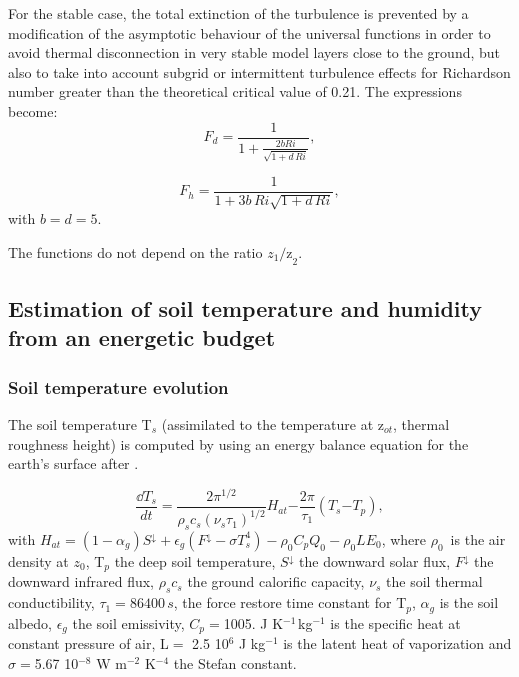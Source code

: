 For the stable case, the total extinction of the turbulence is prevented by
a modification of the asymptotic behaviour of the universal functions in
order to avoid thermal disconnection in very stable model layers close to
the ground, but also to take into account subgrid or intermittent turbulence
effects for Richardson number greater than the theoretical critical value of
0.21. The expressions become:
\begin{equation}
\label{eq20}
F_{d} =\frac{1}{1+\frac{2bRi}{\sqrt
{1+d\, Ri} }},
\end{equation}

\begin{equation}
\label{eq21}
F_{h} =\frac{1}{1+ 3 b \, Ri\sqrt
{1+ d \, Ri} },
\end{equation}
with $b = d = 5$.

The functions do not depend on the ratio $z_{1}
\mbox{/z}_{2} $.

\subsection{Estimation of soil temperature and humidity from an energetic budget}

\subsubsection{Soil temperature evolution}
The soil temperature T$_{s}$ (assimilated to the temperature at z$_{ot}$,
thermal roughness height) is computed by using an energy balance equation
for the earth's surface after \cite{Deardorff:1978}.

\begin{equation}
\label{eq22}
\frac{\dd T_{s}}{dt}\mathrm{=}\frac{\mathrm{2}\pi^{\mathrm{1/2}}}{\rho
_{s}c_{s}\left( \nu_{s}\tau_{\mathrm{1}}
\right)^{\mathrm{1/2}}}H_{at}\mathrm{-}\frac{\mathrm{2}\pi }{\tau
_{\mathrm{1}}}\left( T_{s}\mathrm{-}T_{p} \right),
\end{equation}
\newline
with $H_{at}=\left( 1-\alpha_{g} \right)S^\downarrow +\epsilon
_{g}(F^\downarrow -\sigma T_{s}^{4})-\rho_{0}C_{p}Q_{0}-\rho_{0}LE_{0}$,
\newline
where $\rho_{0}\, $ is the air density at $z_{0}$, T$_{p}$ the deep soil temperature,
\newline
$S^\downarrow $ the downward solar flux, $F^\downarrow $ the downward infrared flux,
\newline
$\rho_{s}c_{s}$ the ground calorific capacity, $\nu_{s}$ the soil thermal conductibility,
\newline
$\tau_{\mathrm{1}}=86400\, s$, the force restore time constant for T$_{p}$,
\newline
$\alpha_{g}$ is the soil albedo, $\epsilon_{g}$ the soil emissivity,
\newline
$C_{p}=$1005. J K$^{-1\, }$kg$^{-1}$ is the specific heat at constant pressure of air,
\newline
L$=$ 2.5 10$^{6}$ J kg$^{-1}$ is the latent heat of vaporization and
\newline
$\sigma =$5.67 10$^{-8}$ W m$^{-2}$ K$^{-4}$ the Stefan constant.

